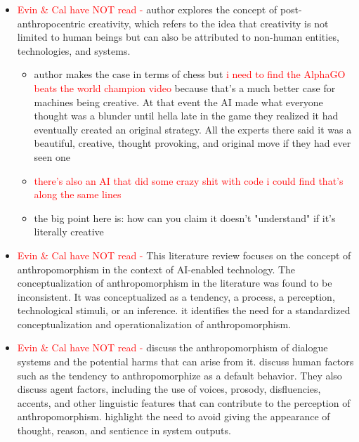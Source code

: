 \documentclass{article}
\begin{document}
\begin{itemize}
\begin{itemize}
\begin{itemize}
        \end{itemize}
        \item \textcolor{red}{Evin \& Cal have NOT read - } \cite{roudavski2016field} author explores the concept of post-anthropocentric creativity, which refers to the idea that creativity is not limited to human beings but can also be attributed to non-human entities, technologies, and systems.
        \begin{itemize}
            \item author makes the case in terms of chess but \textcolor{red}{i need to find the AlphaGO beats the world champion video} because that's a much better case for machines being creative. At that event the AI made what everyone thought was a blunder until hella late in the game they realized it had eventually created an original strategy. All the experts there said it was a beautiful, creative, thought provoking, and original move if they had ever seen one
            \item \textcolor{red}{there's also an AI that did some crazy shit with code i could find that's along the same lines}
            \item the big point here is: how can you claim it doesn't "understand" if it's literally creative
        \end{itemize}
        \item \textcolor{red}{Evin \& Cal have NOT read - } \cite{li2021machinelike} This literature review focuses on the concept of anthropomorphism in the context of AI-enabled technology. The conceptualization of anthropomorphism in the literature was found to be inconsistent. It was conceptualized as a tendency, a process, a perception, technological stimuli, or an inference. it identifies the need for a standardized conceptualization and operationalization of anthropomorphism.
        \item \textcolor{red}{Evin \& Cal have NOT read - } \cite{abercrombie2023mirages} discuss the anthropomorphism of dialogue systems and the potential harms that can arise from it. discuss human factors such as the tendency to anthropomorphize as a default behavior. They also discuss agent factors, including the use of voices, prosody, disfluencies, accents, and other linguistic features that can contribute to the perception of anthropomorphism. highlight the need to avoid giving the appearance of thought, reason, and sentience in system outputs. 

\end{itemize}
\end{itemize}
\end{document}
